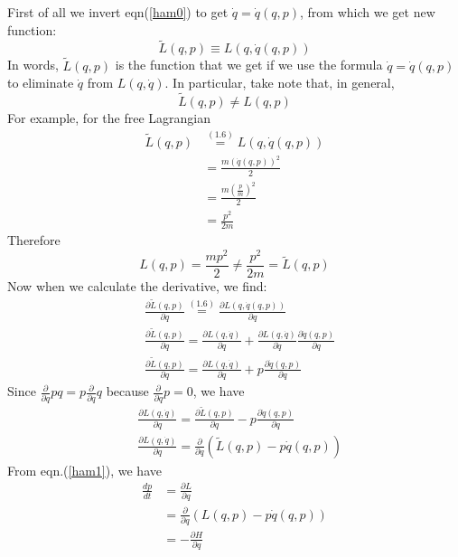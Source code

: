 First of all we invert eqn(\ref{ham0}) to get $\dot{q}=\dot{q}(q, p)$, from which we get new function:
\begin{equation}
    \tilde{L}(q, p) \equiv L(q, \dot{q}(q, p))
\end{equation}
In words, $\tilde{L}(q, p)$ is the function that we get if we use the formula $\dot{q}=\dot{q}(q, p)$ to eliminate $\dot{q}$ from $L(q, \dot{q}) .$ In particular, take note that, in general,
\begin{equation}
\tilde{L}(q, p) \neq L(q, p)
\end{equation}
For example, for the free Lagrangian
$$
\begin{aligned}
\tilde{L}(q, p) & \stackrel{(1.6)}{=} L(q, \dot{q}(q, p)) \\
&=\frac{m(\dot{q}(q, p))^{2}}{2} \\
&=\frac{m\left(\frac{p}{m}\right)^{2}}{2} \\
&=\frac{p^{2}}{2 m}
\end{aligned}
$$
Therefore
$$
L(q, p)=\frac{m p^{2}}{2} \neq \frac{p^{2}}{2 m}=\tilde{L}(q, p)
$$
Now when we calculate the derivative, we find:
$$
\begin{aligned}
&\frac{\partial \tilde{L}(q, p)}{\partial q} \stackrel{(1.6)}{=} \frac{\partial L(q, \dot{q}(q, p))}{\partial q}\\
&\frac{\partial \tilde{L}(q, p)}{\partial q}=\frac{\partial L(q, \dot{q})}{\partial q}+\frac{\partial L(q, \dot{q})}{\partial \dot{q}} \frac{\partial \dot{q}(q, p)}{\partial q}\\
&\frac{\partial \tilde{L}(q, p)}{\partial q}=\frac{\partial L(q, \dot{q})}{\partial q}+p \frac{\partial \dot{q}(q, p)}{\partial q}
\end{aligned}
$$
Since $\frac{\partial}{\partial q} p q=p \frac{\partial}{\partial q} q$ because $\frac{\partial}{\partial q} p=0$, we have
$$
\begin{aligned}
&\frac{\partial L(q, \dot{q})}{\partial q}=\frac{\partial \tilde{L}(q, p)}{\partial q}-p \frac{\partial \dot{q}(q, p)}{\partial q}\\
&\frac{\partial L(q, \dot{q})}{\partial q}=\frac{\partial}{\partial q}(\tilde{L}(q, p)-p \dot{q}(q, p))
\end{aligned}
$$
From eqn.(\ref{ham1}), we have
\begin{equation}
\begin{aligned}
\frac{d p}{d t} &=\frac{\partial L}{\partial q} \\
&=\frac{\partial}{\partial q}(L(q, p)-p \dot{q}(q, p)) \\
&=-\frac{\partial H}{\partial q}
\end{aligned}
\end{equation}

